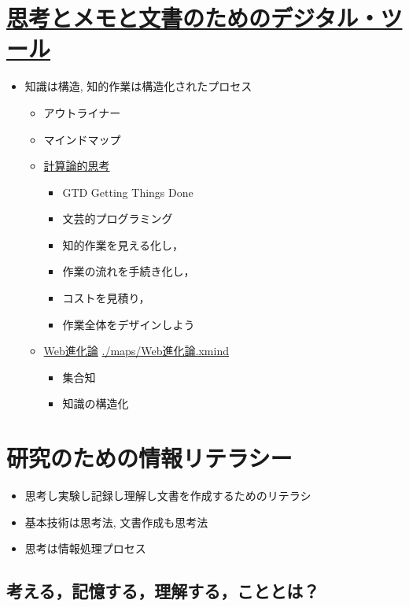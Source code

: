 \documentclass[dvipdfmx,11pat]{jarticle}
\begin{document}
\section{\href{./digital\_tools.org}{思考とメモと文書のためのデジタル・ツール}}
\label{sec:orge01927d}
\begin{itemize}
\item 知識は構造, 知的作業は構造化されたプロセス
\begin{itemize}
\item アウトライナー
\item マインドマップ
\end{itemize}

\begin{itemize}
\item \href{./comp\_thinking.org}{計算論的思考}
\begin{itemize}
\item GTD Getting Things Done
\item 文芸的プログラミング
\item 知的作業を見える化し，
\item 作業の流れを手続き化し，
\item コストを見積り，
\item 作業全体をデザインしよう
\end{itemize}

\item \href{./web.org}{Web進化論}  \url{./maps/Web進化論.xmind}
\begin{itemize}
\item 集合知
\item 知識の構造化
\end{itemize}
\end{itemize}
\end{itemize}
\section{研究のための情報リテラシー}
\label{sec:org42021c8}
\begin{itemize}
\item 思考し実験し記録し理解し文書を作成するためのリテラシ
\item 基本技術は思考法, 文書作成も思考法
\item 思考は情報処理プロセス
\end{itemize}
\subsection{考える，記憶する，理解する，こととは？}
\label{sec:orge7d9629}
\end{document}

